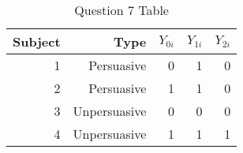 \documentclass[11pt,notitlepage]{article}\usepackage[]{graphicx}\usepackage[]{color}
\begin{document}
\begin{table}[H]
  \centering
  \caption{Question 7 Table}
    \begin{tabular}{rrrrr}
    \toprule
    Subject  & Type  & $Y_{0i}$   & $Y_{1i}$   & $Y_{2i}$  \\
    \midrule
    1     & Persuasive  & 0     & 1     & 0 \\
    2     & Persuasive  & 1     & 1     & 0 \\
    3     & Unpersuasive  & 0     & 0     & 0 \\
    4     & Unpersuasive  & 1     & 1     & 1 \\
    \bottomrule
    \end{tabular}%
  \label{tab:addlabel}%
\end{table}%
\end{document}
